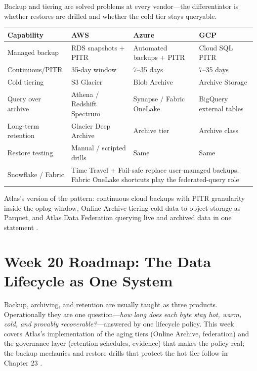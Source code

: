 \begin{crosscloud}
Backup and tiering are solved problems at every vendor---the differentiator is whether restores are drilled and whether the cold tier stays queryable.

\vspace{2mm}
{\footnotesize
\begin{tabular}{@{}p{2.9cm}p{3.0cm}p{3.0cm}p{3.0cm}@{}} 
\toprule
\textbf{Capability} & \textbf{AWS} & \textbf{Azure} & \textbf{GCP} \\
\midrule
Managed backup & RDS snapshots + PITR & Automated backups + PITR & Cloud SQL PITR \\
Continuous/PITR & 35-day window & 7--35 days & 7--35 days \\
Cold tiering & S3 Glacier & Blob Archive & Archive Storage \\
Query over archive & Athena / Redshift Spectrum & Synapse / Fabric OneLake & BigQuery external tables \\
Long-term retention & Glacier Deep Archive & Archive tier & Archive class \\
Restore testing & Manual / scripted drills & Same & Same \\
\addlinespace
Snowflake / Fabric & \multicolumn{3}{l}{Time Travel + Fail-safe replace user-managed backups; Fabric OneLake shortcuts play the federated-query role} \\
\bottomrule
\end{tabular}}

\vspace{1mm}
Atlas's version of the pattern: continuous cloud backups with PITR granularity inside the oplog window, Online Archive tiering cold data to object storage as Parquet, and Atlas Data Federation querying live and archived data in one statement \cite{mongodbAtlasBackupDocs,mongodbOnlineArchiveDocs}.
\end{crosscloud}

\section{Week 20 Roadmap: The Data Lifecycle as One System}
Backup, archiving, and retention are usually taught as three products. Operationally they are one question---\emph{how long does each byte stay hot, warm, cold, and provably recoverable?}---answered by one lifecycle policy. This week covers Atlas's implementation of the aging tiers (Online Archive, federation) and the governance layer (retention schedules, evidence) that makes the policy real; the backup mechanics and restore drills that protect the hot tier follow in Chapter 23 \cite{mongodbAtlasBackupDocs,mongodbOnlineArchiveDocs}.

